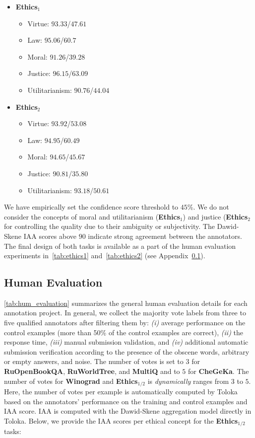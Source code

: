 \documentclass[11pt]{article}
\begin{document}
\begin{itemize}\item \textbf{Ethics$_1$}
    \begin{itemize}\item Virtue: $93.33$/$47.61$
        \item Law: $95.06$/$60.7$
        \item Moral: $91.26$/$39.28$
        \item Justice: $96.15$/$63.09$
        \item Utilitarianism: $90.76$/$44.04$
    \end{itemize}
    
    \item \textbf{Ethics$_2$}
    \begin{itemize}\item Virtue: $93.92$/$53.08$
        \item Law: $94.95$/$60.49$
        \item Moral: $94.65$/$45.67$
        \item Justice: $90.81$/$35.80$
        \item Utilitarianism: $93.18$/$50.61$
    \end{itemize}
\end{itemize}

We have empirically set the confidence score threshold to $45$\%. We do not consider the concepts of moral and utilitarianism (\textbf{Ethics$_1$}) and justice (\textbf{Ethics$_2$} for controlling the quality due to their ambiguity or subjectivity. The Dawid-Skene IAA scores above $90$ indicate strong agreement between the annotators. The final design of both tasks is available as a part of the human evaluation experiments in~\autoref{tab:ethics1} and~\autoref{tab:ethics2} (see Appendix~\ref{app:human_evaluation}).

\subsection{Human Evaluation}
\label{app:human_evaluation}
\autoref{tab:hum_evaluation} summarizes the general human evaluation details for each annotation project. In general, we collect the majority vote labels from three to five qualified annotators after filtering them by: \emph{(i)} average performance on the control examples (more than 50\% of the control examples are correct), \emph{(ii)} the response time, \emph{(iii)} manual submission validation, and \emph{(iv)} additional automatic submission verification according to the presence of the obscene words, arbitrary or empty answers, and noise. The number of votes is set to $3$ for \textbf{RuOpenBookQA}, \textbf{RuWorldTree}, and \textbf{MultiQ} and to $5$ for \textbf{CheGeKa}. The number of votes for \textbf{Winograd} and \textbf{Ethics$_{1/2}$} is \emph{dynamically} ranges from $3$ to $5$. Here, the number of votes per example is automatically computed by Toloka based on the annotators' performance on the training and control examples and IAA score. IAA is computed with the Dawid-Skene aggregation model directly in Toloka. Below, we provide the IAA scores per ethical concept for the \textbf{Ethics$_{1/2}$} tasks:
\end{document}
